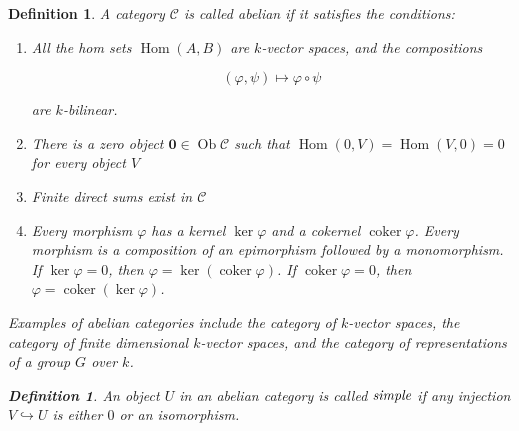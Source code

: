 \documentclass[]{article}
\newtheorem{defn}[theorem]{Definition}
\newcommand{\Hom}{\operatorname{Hom}}
\newcommand{\coker}{\operatorname{coker}}
\newcommand{\Ob}{\operatorname{Ob}}
\numberwithin{equation}{subsection}
\begin{document}
\begin{defn}
    A category $\mathcal{C}$ is called \emph{abelian} if it satisfies the conditions:

    \begin{enumerate}
    \renewcommand{\labelenumi}{\roman{enumi})}
        \item All the hom sets $\Hom(A,B)$ are $k$-vector spaces, and the compositions
            
            \begin{equation}
                (\varphi, \psi) \mapsto \varphi \circ \psi
            \end{equation}

            are $k$-bilinear.
        \item There is a zero object $\mathbf{0} \in \Ob \mathcal{C}$ such that $\Hom(0,V) = \Hom(V,0) = 0$ for every object $V$
        \item Finite direct sums exist in $\mathcal{C}$
        \item Every morphism $\varphi$ has a kernel $\ker \varphi$ and a
            cokernel $\coker \varphi$. Every morphism is a composition of an
            epimorphism followed by a monomorphism. If $\ker \varphi = 0$, then
            $\varphi = \ker(\coker \varphi)$. If $\coker \varphi = 0$, then
            $\varphi = \coker(\ker \varphi)$.
    \end{enumerate}

    Examples of abelian categories include the category of $k$-vector spaces,
    the category of finite dimensional $k$-vector spaces, and the category of
    representations of a group $G$ over $k$.

    \begin{defn}
        An object $U$ in an abelian category is called $\emph{simple}$ if any
        injection $V \hookrightarrow U$ is either $0$ or an isomorphism.
    \end{defn}
\end{defn}
\end{document}
